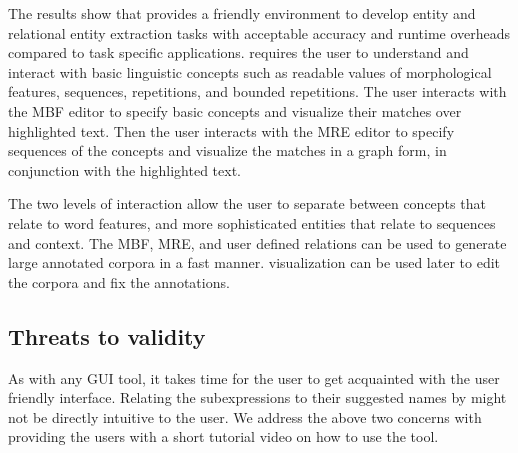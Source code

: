 The results show that \framework 
provides a friendly environment to develop entity and relational
entity extraction tasks with acceptable 
accuracy and runtime overheads compared to task specific applications. 
%
\framework requires the user to understand and interact with 
basic linguistic concepts such as readable values of morphological 
features, sequences, repetitions, and bounded repetitions.
The user interacts with the MBF editor to specify basic concepts
and visualize their matches over highlighted text. 
%
Then the user interacts with the MRE editor to specify 
sequences of the concepts and visualize the matches
in a graph form, in conjunction with the highlighted text.

The two levels of interaction allow the user to separate between concepts 
that relate to word features, and more sophisticated entities 
that relate to sequences and context. 
%
The MBF, MRE, and user defined relations 
can be used to generate large annotated corpora in a fast manner. 
\framework visualization can be used later to edit the corpora 
and fix the annotations.

\subsection{ Threats to validity}
As with any GUI tool, it takes time for the user to get acquainted with the 
user friendly interface. 
Relating the subexpressions to their suggested names by \framework might 
not be directly intuitive to the user. 
We address the above two concerns with providing the users with 
a short tutorial video on how to use the tool. 


